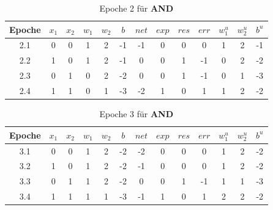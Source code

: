 \setlength{\tabcolsep}{0.8em}
\begin{table} %
    \centering
    \begin{tabular}{c | c | c | c | c | c | c | c | c | c | c | c | c}
        Epoche & $x_1$ & $x_2$ & $w_1$ & $w_2$ & $b$ & $net$ & $exp$ & $res$ & $err$ & $w^u_1$ & $w^u_2$ & $b^u$ \\
        \hline
        2.1& 0     & 0     & 1     & 2     & -1  & -1    & 0     & 0     & 0   & 1       & 2       & -1    \\
        2.2& 1     & 0     & 1     & 2     & -1  & 0     & 0     & 1     & -1  & 0       & 2       & -2    \\
        2.3& 0     & 1     & 0     & 2     & -2  & 0     & 0     & 1     & -1  & 0       & 1       & -3    \\
        2.4& 1     & 1     & 0     & 1     & -3  & -2    & 1     & 0     & 1   & 1       & 2       & -2    \\
    \end{tabular}
    \caption{Epoche 2 für \textbf{AND}}
    \label{tab:mcp-andep2}
\end{table}

\setlength{\tabcolsep}{0.8em}
\begin{table} %
    \centering
    \begin{tabular}{c | c | c | c | c | c | c | c | c | c | c | c | c}
        Epoche & $x_1$ & $x_2$ & $w_1$ & $w_2$ & $b$ & $net$ & $exp$ & $res$ & $err$ & $w^u_1$ & $w^u_2$ & $b^u$ \\
        \hline
        3.1& 0     & 0     & 1     & 2     & -2  & -2    & 0     & 0     & 0   & 1       & 2       & -2    \\
        3.2& 1     & 0     & 1     & 2     & -2  & -1    & 0     & 0     & 0   & 1       & 2       & -2    \\
        3.3& 0     & 1     & 1     & 2     & -2  & 0     & 0     & 1     & -1  & 1       & 1       & -3    \\
        3.4& 1     & 1     & 1     & 1     & -3  & -1    & 1     & 0     & 1   & 2       & 2       & -2    \\
    \end{tabular}
    \caption{Epoche 3 für \textbf{AND}}
    \label{tab:mcp-andep3}
\end{table}


